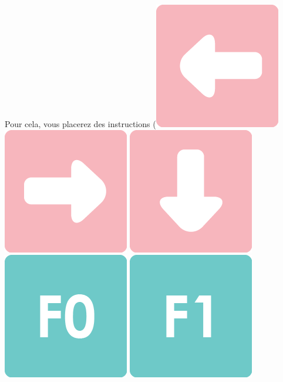 \documentclass[a4paper]{article}
\begin{document}
\begin{minipage}{6cm}
Pour cela, vous
placerez des
  instructions (\includegraphics[height=\baselineskip]{left} 
\includegraphics[height=\baselineskip]{right} 
\includegraphics[height=\baselineskip]{down} 
\includegraphics[height=\baselineskip]{f0} 
\includegraphics[height=\baselineskip]{f1}

\end{minipage}
\end{document}
